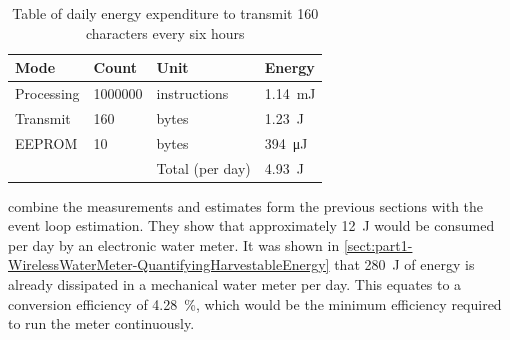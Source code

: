     \begin{table}
      \centering
      \begin{tabular}{|l|l|l|l|}
        \hline
        Mode & Count & Unit & Energy \\ \hline
        Processing & 1000000 & instructions & \SI{1.14}{\milli\joule} \\
        Transmit & 160 & bytes & \SI{1.23}{\joule} \\
        EEPROM & 10 & bytes & \SI{394}{\micro\joule} \\ \hline \hline
        &&Total (per day) & \SI{4.93}{\joule} \\ \hline
      \end{tabular}
      \caption{\label{tab:EnergyBudget-Transmission}Table of daily energy expenditure to transmit 160 characters every six hours}
    \end{table}

     combine the measurements and estimates form the previous sections with the event loop estimation.
    They show that approximately \SI{12}{\joule} would be consumed per day by an electronic water meter.
    It was shown in \cref{sect:part1-WirelessWaterMeter-QuantifyingHarvestableEnergy} that \SI{280}{\joule} of energy is already dissipated in a mechanical water meter per day.
    This equates to a conversion efficiency of \SI{4.28}{\percent}, which would be the minimum efficiency required to run the meter continuously.
